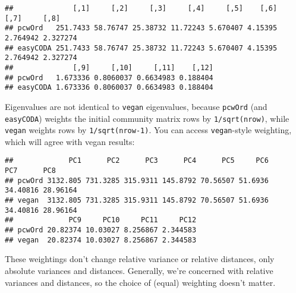 \documentclass[
]{article}
\newenvironment{Shaded}{\begin{snugshade}}{\end{snugshade}}
\newcommand{\DataTypeTok}[1]{\textcolor[rgb]{0.13,0.29,0.53}{#1}}
\newcommand{\DecValTok}[1]{\textcolor[rgb]{0.00,0.00,0.81}{#1}}
\newcommand{\KeywordTok}[1]{\textcolor[rgb]{0.13,0.29,0.53}{\textbf{#1}}}
\newcommand{\NormalTok}[1]{#1}
\newcommand{\OperatorTok}[1]{\textcolor[rgb]{0.81,0.36,0.00}{\textbf{#1}}}
\newcommand{\OtherTok}[1]{\textcolor[rgb]{0.56,0.35,0.01}{#1}}
\newcommand{\StringTok}[1]{\textcolor[rgb]{0.31,0.60,0.02}{#1}}
\begin{document}
\begin{verbatim}
##              [,1]     [,2]     [,3]     [,4]     [,5]    [,6]     [,7]     [,8]
## pcwOrd   251.7433 58.76747 25.38732 11.72243 5.670407 4.15395 2.764942 2.327274
## easyCODA 251.7433 58.76747 25.38732 11.72243 5.670407 4.15395 2.764942 2.327274
##              [,9]     [,10]     [,11]    [,12]
## pcwOrd   1.673336 0.8060037 0.6634983 0.188404
## easyCODA 1.673336 0.8060037 0.6634983 0.188404
\end{verbatim}

Eigenvalues are not identical to \texttt{vegan} eigenvalues, because
\texttt{pcwOrd} (and \texttt{easyCODA}) weights the initial community
matrix rows by \texttt{1/sqrt(nrow)}, while \texttt{vegan} weights rows
by \texttt{1/sqrt(nrow-1)}. You can access \texttt{vegan}-style
weighting, which will agree with vegan results:

\begin{Shaded}
\end{Shaded}

\begin{verbatim}
##             PC1      PC2      PC3      PC4      PC5     PC6      PC7      PC8
## pcwOrd 3132.805 731.3285 315.9311 145.8792 70.56507 51.6936 34.40816 28.96164
## vegan  3132.805 731.3285 315.9311 145.8792 70.56507 51.6936 34.40816 28.96164
##             PC9     PC10     PC11     PC12
## pcwOrd 20.82374 10.03027 8.256867 2.344583
## vegan  20.82374 10.03027 8.256867 2.344583
\end{verbatim}

These weightings don't change relative variance or relative distances,
only absolute variances and distances. Generally, we're concerned with
relative variances and distances, so the choice of (equal) weighting
doesn't matter.

\begin{Shaded}
\end{Shaded}
\end{document}
